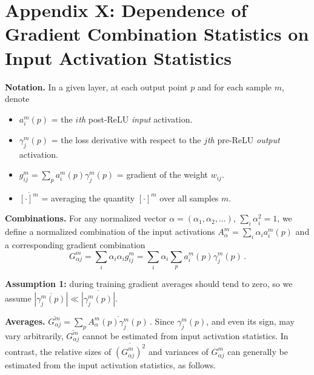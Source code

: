 \documentclass{article} %
\begin{document}
\section{Appendix X: Dependence of Gradient Combination Statistics on Input Activation Statistics}
\label{sec:x}

{\bf Notation.} In a given layer, at each output point $p$ and for each sample $m$, denote
\begin{itemize}
    \item $a^m_i(p)$ = the $i${\it th} post-ReLU {\it input} activation.
    \item $\gamma^m_j(p)$ = the loss derivative with respect to the $j${\it th} pre-ReLU
    {\it output} activation.
    \item $g^m_{ij} = \sum_p a^m_i(p) \gamma^m_j(p)$ = gradient of the weight $w_{ij}$.
    \item $\overline{[\cdot]^m}$ = averaging the quantity $[\cdot]^m$ over all samples $m$.
\end{itemize}

{\bf Combinations.} For any normalized vector $\alpha = (\alpha_1, \alpha_2, ...)$, $\sum_i \alpha_i^2 = 1$, we define a normalized combination of the input activations $A^m_{\alpha} = \sum_i \alpha_i a^m_i(p)$ and a corresponding gradient combination
$$ G^m_{\alpha j} = \sum_i \alpha_i \alpha_i g^m_{ij} = \sum_i \alpha_i \sum_p a^m_i(p) \gamma^m_j(p)\,.$$

{\bf Assumption 1:} during training gradient averages should tend to zero, so we assume $|\overline{\gamma^m_j(p)}| \ll \overline{|\gamma^m_j(p)|}$.

{\bf Averages.} $\overline{G^m_{\alpha j}} = \sum_p \overline{A^m_{\alpha}(p) \gamma^m_j(p)}\,.$
Since $\gamma^m_j(p)$, and even its sign, may vary arbitrarily, $\overline{G^m_{\alpha j}}$ cannot be estimated from input activation statistics. In contrast, the relative sizes of $\overline{(G^m_{\alpha j})^2}$ and variances of $G^m_{\alpha j}$ can generally be estimated from the input activation statistics, as follows.
\end{document}
